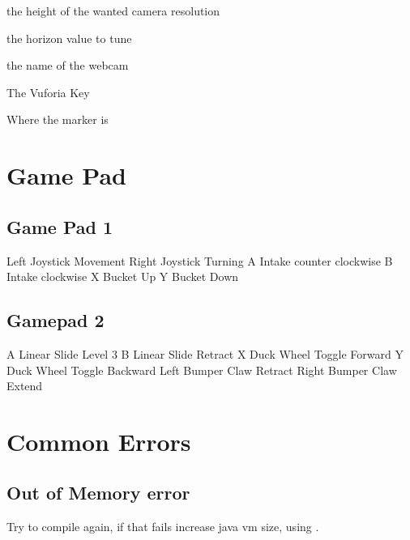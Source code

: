 \documentclass[letterpaper,10pt,english]{sphinxmanual}
\begin{document}
\sphinxAtStartPar
{} \sphinxhyphen{} the height of the wanted camera resolution

\sphinxAtStartPar
{} \sphinxhyphen{} the horizon value to tune

\sphinxAtStartPar
{} \sphinxhyphen{} the name of the webcam

\sphinxAtStartPar
{} \sphinxhyphen{} The Vuforia Key

\sphinxAtStartPar
{} \sphinxhyphen{} Where the marker is


\section{Game Pad}
\label{\detokenize{game_pad:game-pad}}\label{\detokenize{game_pad::doc}}

\subsection{Game Pad 1}
\label{\detokenize{game_pad:game-pad-1}}

\sphinxAtStartPar
Left Joystick \sphinxhyphen{} Movement
Right Joystick \sphinxhyphen{} Turning
A \sphinxhyphen{} Intake counter clockwise
B \sphinxhyphen{} Intake clockwise
X \sphinxhyphen{}  Bucket Up
Y \sphinxhyphen{} Bucket Down


\subsection{Gamepad 2}
\label{\detokenize{game_pad:gamepad-2}}
\sphinxAtStartPar
A \sphinxhyphen{} Linear Slide Level 3
B \sphinxhyphen{} Linear Slide Retract
X \sphinxhyphen{} Duck Wheel Toggle Forward
Y \sphinxhyphen{} Duck Wheel Toggle Backward
Left Bumper \sphinxhyphen{} Claw Retract
Right Bumper \sphinxhyphen{} Claw Extend


\section{Common Errors}
\label{\detokenize{common_errors:common-errors}}\label{\detokenize{common_errors::doc}}

\subsection{Out of Memory error}
\label{\detokenize{common_errors:out-of-memory-error}}
\sphinxAtStartPar
Try to compile again, if that fails increase java vm size, using .
\end{document}
